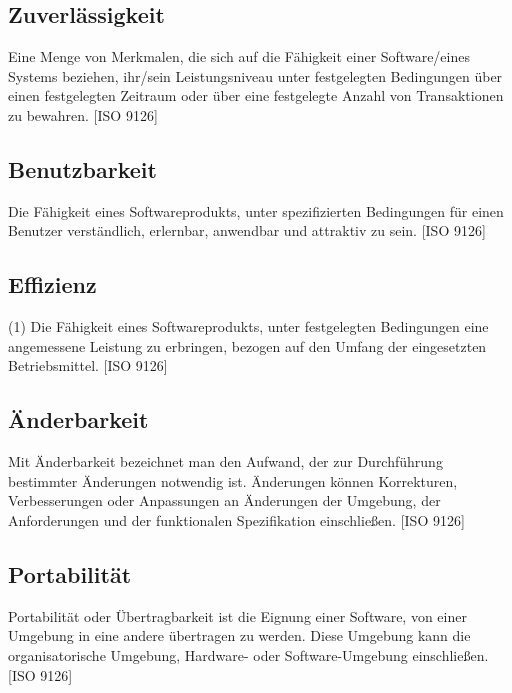 \documentclass[10pt]{scrreprt}
\begin{document}
\subsection*{Zuverlässigkeit}
Eine Menge von Merkmalen, die sich auf die Fähigkeit einer Software/eines Systems beziehen, ihr/sein Leistungsniveau unter festgelegten Bedingungen über einen festgelegten Zeitraum oder über eine festgelegte Anzahl von Transaktionen zu bewahren. [ISO 9126]

\subsection*{Benutzbarkeit}
Die Fähigkeit eines Softwareprodukts, unter spezifizierten Bedingungen für einen Benutzer verständlich, erlernbar, anwendbar und attraktiv zu sein. [ISO 9126]

\subsection*{Effizienz}
(1) Die Fähigkeit eines Softwareprodukts, unter festgelegten Bedingungen eine angemessene Leistung zu erbringen, bezogen auf den Umfang der eingesetzten Betriebsmittel. [ISO 9126]

\subsection*{Änderbarkeit}
Mit Änderbarkeit bezeichnet man den Aufwand, der zur Durchführung bestimmter Änderungen notwendig ist. Änderungen können Korrekturen, Verbesserungen oder Anpassungen an Änderungen der Umgebung, der Anforderungen und der funktionalen Spezifikation einschließen. [ISO 9126]

\subsection*{Portabilität}
Portabilität oder Übertragbarkeit ist die Eignung einer Software, von einer Umgebung in eine andere übertragen zu werden. Diese Umgebung kann die organisatorische Umgebung, Hardware- oder Software-Umgebung einschließen. [ISO 9126]
\end{document}
